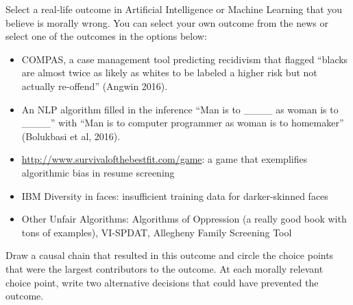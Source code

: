 \documentclass[submit]{harvardml}
\begin{document}
\begin{problem}

Select a real-life outcome in Artificial Intelligence or Machine Learning 
that you believe is morally wrong. You can select your own outcome from 
the news or select one of the outcomes in the options below:

\begin{itemize}
    \item COMPAS, a case management tool predicting recidivism that 
        flagged “blacks are almost twice as likely as whites to be 
        labeled a higher risk but not actually re-offend” (Angwin 
        2016).
        
    \item An NLP algorithm filled in the inference “Man is to 
        \_\_\_\_ as woman is to \_\_\_\_” with “Man is 
        to computer programmer as woman is to homemaker” (Bolukbasi 
        et al, 2016).
        
    \item \url{http://www.survivalofthebestfit.com/game}: a game that 
        exemplifies algorithmic bias in resume screening
        
    \item IBM Diversity in faces: insufficient training data for 
        darker-skinned faces
        
    \item Other Unfair Algorithms: Algorithms of Oppression (a really 
        good book with tons of examples), VI-SPDAT, Allegheny Family 
        Screening Tool
        
\end{itemize}
Draw a causal chain that resulted in this outcome and circle the choice points that were the largest contributors to the outcome. At each morally relevant choice point, write two alternative decisions that could have prevented the outcome.

\end{problem}
\end{document}

